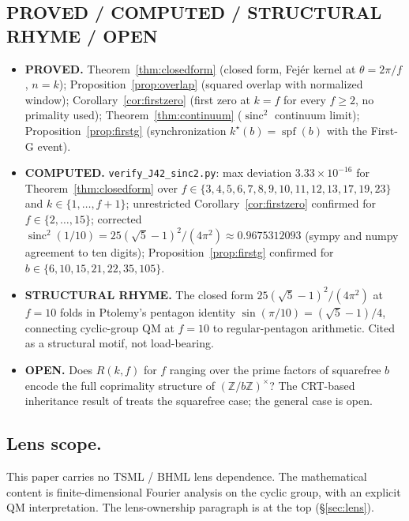 \documentclass[11pt,reqno]{amsart}
\theoremstyle{plain}
\theoremstyle{definition}
\theoremstyle{remark}
\newcommand{\Z}{\mathbb{Z}}
\newcommand{\spf}{\operatorname{spf}}
\DeclareMathOperator{\sinc}{sinc}
\begin{document}
\subsection{PROVED / COMPUTED / STRUCTURAL RHYME / OPEN}

\begin{itemize}\setlength\itemsep{2pt}
  \item \textbf{PROVED.} Theorem~\ref{thm:closedform} (closed form, Fej\'er kernel at
    $\theta = 2\pi/f$, $n = k$); Proposition~\ref{prop:overlap} (squared overlap with
    normalized window); Corollary~\ref{cor:firstzero} (first zero at $k = f$ for every
    $f \ge 2$, no primality used); Theorem~\ref{thm:continuum} ($\sinc^{2}$ continuum
    limit); Proposition~\ref{prop:firstg} (synchronization
    $k^{\star}(b) = \spf(b)$ with the First-G event).
  \item \textbf{COMPUTED.} \texttt{verify\_J42\_sinc2.py}: max deviation
    $3.33\times 10^{-16}$ for Theorem~\ref{thm:closedform} over
    $f \in \{3,4,5,6,7,8,9,10,11,12,13,17,19,23\}$ and $k \in \{1,\dots,f+1\}$;
    unrestricted Corollary~\ref{cor:firstzero} confirmed for $f \in \{2,\dots,15\}$;
    corrected $\sinc^{2}(1/10) = 25(\sqrt{5}-1)^{2}/(4\pi^{2}) \approx 0.9675312093$
    (sympy and numpy agreement to ten digits); Proposition~\ref{prop:firstg} confirmed
    for $b \in \{6, 10, 15, 21, 22, 35, 105\}$.
  \item \textbf{STRUCTURAL RHYME.} The closed form $25(\sqrt{5}-1)^{2}/(4\pi^{2})$ at
    $f = 10$ folds in Ptolemy's pentagon identity
    $\sin(\pi/10) = (\sqrt{5}-1)/4$, connecting cyclic-group QM at $f = 10$ to
    regular-pentagon arithmetic. Cited as a structural motif, not load-bearing.
  \item \textbf{OPEN.} Does $R(k,f)$ for $f$ ranging over the prime factors of squarefree
    $b$ encode the full coprimality structure of $(\Z/b\Z)^{\times}$? The CRT-based
    inheritance result of \cite{SandersGishSincZero} treats the squarefree case; the
    general case is open.
\end{itemize}

\subsection{Lens scope.}
This paper carries no TSML / BHML lens dependence. The mathematical content is
finite-dimensional Fourier analysis on the cyclic group, with an explicit QM
interpretation. The lens-ownership paragraph is at the top (\S\ref{sec:lens}).
\end{document}
